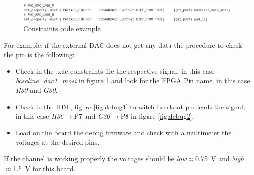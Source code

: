 \begin{figure}[H]
\centering
\includegraphics[width=0.9\linewidth]{IMG/ch3/DEBUG3}
\caption{Constraints code example}
\label{fig:debug3}
\end{figure}
\noindent For example; if the external DAC does not get any data the procedure to check the pin is the following:
\begin{itemize}
	\item Check in the .xdc constraints file the respective signal, in this case \textit{baseline\_dac1\_mosi} in figure \ref{fig:debug3} and look for the FPGA Pin name, in this case \textit{H30} and \textit{G30}.
	\item Check in the HDL, figure \ref{fig:debug1} to witch breakout pin leads the signal; in this case \textit{H30}$\rightarrow$P7 and \textit{G30}$\rightarrow$P8 in figure \ref{fig:debug2}.
	\item Load on the board the debug firmware and check with a multimeter the voltages at the desired pins.    
\end{itemize}
\noindent If the channel is working properly the voltages should be \textit{low}$\approx$0.75~V and \textit{high}$\approx$1.5~V for this board.  
































